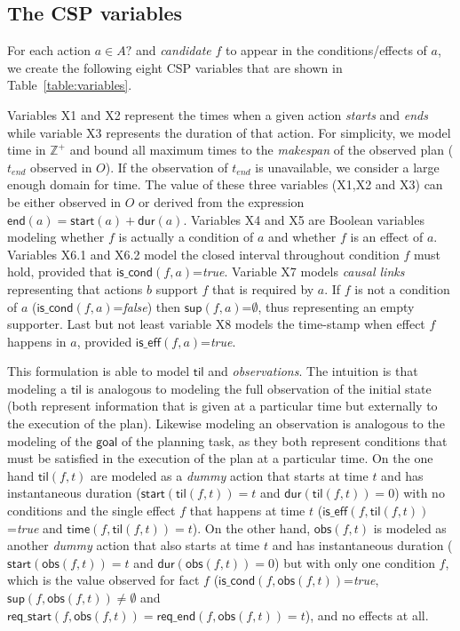 \documentclass{ecai}
\newcommand{\dur}{\mathsf{dur}}    %
\newcommand{\iscond}{\mathsf{is\_cond}}    %
\newcommand{\iseff}{\mathsf{is\_eff}}    %
\newcommand{\obs}{\mathsf{obs}}    %
\newcommand{\start}{\mathsf{start}}%
\newcommand{\en}{\mathsf{end}}     %
\newcommand{\til}{\mathsf{til}}    %
\newcommand{\supp}{\mathsf{sup}}   %
\newcommand{\tim}{\mathsf{time}}   %
\newcommand{\reqs}{\mathsf{req\_{start}}} %
\newcommand{\reqe}{\mathsf{req\_{end}}}   %
\newcommand{\goal}{\mathsf{goal}}  %
\begin{document}
\subsection{The CSP variables}
For each action $a\in A?$ and {\em candidate} $f$ to appear in the conditions/effects of $a$, we create the following eight CSP variables that are shown in Table~\ref{table:variables}. 

Variables X1 and X2 represent the times when a given action {\em starts} and {\em ends} while variable X3 represents the duration of that action. For simplicity, we model time in $\mathbb{Z}^+$ and bound all maximum times to the {\em makespan} of the observed plan ($t_{end}$ observed in $O$). If the observation of $t_{end}$ is unavailable, we consider a large enough domain for time. The value of these three variables (X1,X2 and X3) can be either observed in $O$ or derived from the expression $\en(a)=\start(a)+\dur(a)$. Variables X4 and X5 are Boolean variables modeling whether $f$ is actually a condition of $a$ and whether $f$ is an effect of $a$. Variables X6.1 and X6.2 model the closed interval throughout condition $f$ must hold, provided that $\iscond(f,a)$=\textit{true}. Variable X7 models {\em causal links} representing that actions $b$ support $f$ that is required by $a$. If $f$ is not a condition of $a$ ($\iscond(f,a)$=\textit{false}) then $\supp(f,a)$=$\emptyset$, thus representing an empty supporter. Last but not least variable X8 models the time-stamp when effect $f$ happens in $a$, provided $\iseff(f,a)$=\textit{true}.

This formulation is able to model $\til$ and {\em observations}. The intuition is that modeling a $\til$ is analogous to modeling the full observation of the initial state (both represent information that is given at a particular time but externally to the execution of the plan). Likewise modeling an observation is analogous to the modeling of the $\goal$ of the planning task, as they both represent conditions that must be satisfied in the execution of the plan at a particular time. On the one hand $\til(f,t)$ are modeled as a {\em dummy} action that starts at time $t$ and has instantaneous duration ($\start(\til(f,t))=t$ and $\dur(\til(f,t))=0$) with no conditions and the single effect $f$ that happens at time $t$ ($\iseff(f,\til(f,t))$=\textit{true} and $\tim(f,\til(f,t))=t$). On the other hand, $\obs(f,t)$ is modeled as another {\em dummy} action that also starts at time $t$ and has instantaneous duration ($\start(\obs(f,t))=t$ and $\dur(\obs(f,t))=0$) but with only one condition $f$, which is the value observed for fact $f$ ($\iscond(f,\obs(f,t))$=\textit{true}, $\supp(f,\obs(f,t))\neq \emptyset$ and $\reqs(f,\obs(f,t))=\reqe(f,\obs(f,t))=t$), and no effects at all. 
\end{document}
